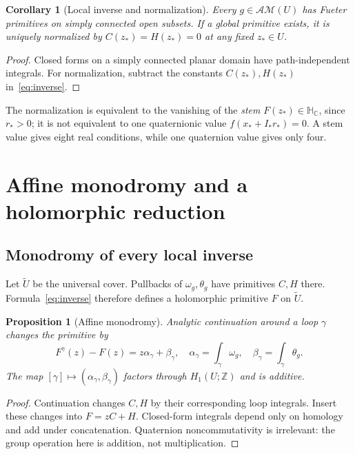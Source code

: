 \documentclass[11pt,a4paper]{article}
\numberwithin{equation}{section}
\newtheorem{proposition}[theorem]{Proposition}
\newtheorem{corollary}[theorem]{Corollary}
\theoremstyle{definition}
\theoremstyle{remark}
\newcommand{\C}{\mathbb C}
\newcommand{\HC}{\mathbb H_{\C}}
\newcommand{\AM}{\mathcal{AM}}
\begin{document}
\begin{corollary}[Local inverse and normalization]\label{cor:local}
Every $g\in\AM(U)$ has Fueter primitives on simply connected open
subsets. If a global primitive exists, it is uniquely normalized by
$C(z_*)=H(z_*)=0$ at any fixed $z_*\in U$.
\end{corollary}
\begin{proof}
Closed forms on a simply connected planar domain have path-independent
integrals. For normalization, subtract the constants $C(z_*),H(z_*)$
in~\eqref{eq:inverse}.
\end{proof}
The normalization is equivalent to the vanishing of the \emph{stem}
$F(z_*)\in\HC$, since $r_*>0$; it is not equivalent to one quaternionic
value $f(x_*+I_*r_*)=0$. A stem value gives eight real conditions, while
one quaternion value gives only four.

\section{Affine monodromy and a holomorphic reduction}
\label{sec:second}

\subsection{Monodromy of every local inverse}
Let $\widetilde U$ be the universal cover. Pullbacks of $\omega_g,
\theta_g$ have primitives $C,H$ there. Formula~\eqref{eq:inverse}
therefore defines a holomorphic primitive $F$ on $\widetilde U$.

\begin{proposition}[Affine monodromy]\label{prop:monodromy}
Analytic continuation around a loop $\gamma$ changes the primitive by
\begin{equation}
 F^\gamma(z)-F(z)=z\alpha_\gamma+\beta_\gamma,
 \quad
 \alpha_\gamma=\int_\gamma\omega_g,\quad
 \beta_\gamma=\int_\gamma\theta_g.
 \label{eq:monodromy}
\end{equation}
The map $[\gamma]\mapsto(\alpha_\gamma,\beta_\gamma)$ factors through
$H_1(U;\mathbb Z)$ and is additive.
\end{proposition}
\begin{proof}
Continuation changes $C,H$ by their corresponding loop integrals.
Insert these changes into $F=zC+H$. Closed-form integrals depend only on
homology and add under concatenation. Quaternion noncommutativity is
irrelevant: the group operation here is addition, not multiplication.
\end{proof}
\end{document}
